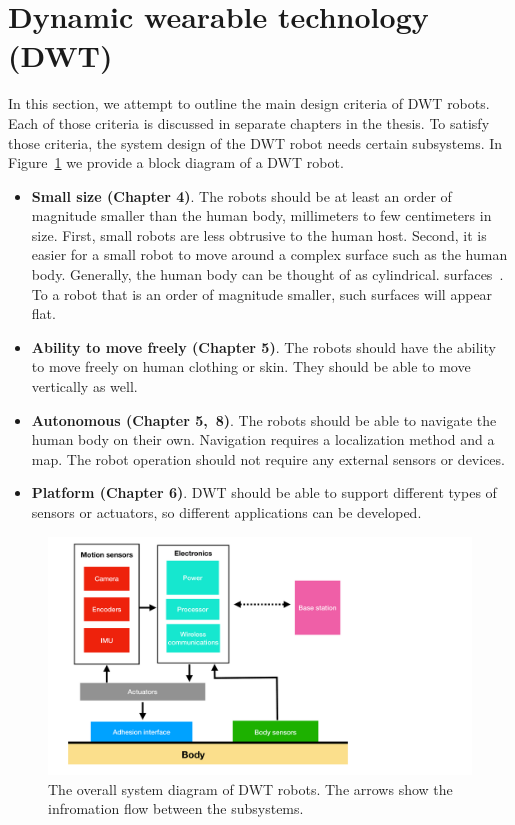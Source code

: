 \section{Dynamic wearable technology (DWT)}
In this section, we attempt to outline the main design criteria of DWT robots. Each of those criteria is discussed in separate chapters in the thesis. To satisfy those criteria, the system design of the DWT robot needs certain subsystems. In Figure~\ref{fig:overall_system} we provide a block diagram of a DWT robot.
\begin{itemize}
    
\item \textbf{Small size (Chapter 4)}. \textit{}The robots should be at least an order of magnitude smaller than the human body, millimeters to few centimeters in size. First, small robots are less obtrusive to the human host. Second, it is easier for a small robot to move around a complex surface such as the human body. Generally, the human body can be thought of as cylindrical.  surfaces~\cite{dodig2016models}. To a robot that is an order of magnitude smaller, such surfaces will appear flat. 
\item \textbf{Ability to move freely (Chapter 5)}. The robots should have the ability to move freely on human clothing or skin. They should be able to move vertically as well.
\item \textbf{Autonomous (Chapter 5,~8)}. The robots should be able to navigate the human body on their own. Navigation requires a localization method and a map.  The robot operation should not require any external sensors or devices. 
\item \textbf{Platform (Chapter 6)}. DWT should be able to support different types of sensors or actuators, so different applications can be developed. 
\end{itemize}

\begin{figure}[!ht]
\centering
\includegraphics[width=\textwidth]{pictures/chapter1/robots_systems.pdf}
\caption{The overall system diagram of DWT robots. The arrows show the infromation flow between the subsystems. }
\label{fig:overall_system}
\end{figure}

